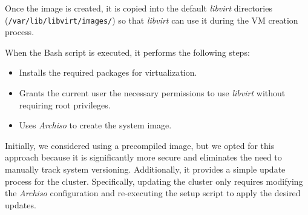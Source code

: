 Once the image is created, it is copied into the default 	\textit{libvirt} directories
(\texttt{/var/lib/libvirt/images/}) so that \textit{libvirt} can use it during 
the VM creation process.

When the Bash script is executed, it performs the following steps:
\begin{itemize}
	\item Installs the required packages for virtualization.
	\item Grants the current user the necessary permissions to use \textit{libvirt} 
    without requiring root privileges.
  \item Uses \textit{Archiso} to create the system image.
\end{itemize}
      Initially, we considered using a precompiled image, but we opted for this 
      approach because it is significantly more secure and eliminates the need to 
      manually track system versioning. Additionally, it provides a simple update 
      process for the cluster. Specifically, updating the cluster only requires modifying 
      the \textit{Archiso} configuration and re-executing the setup script to apply 
      the desired updates.
